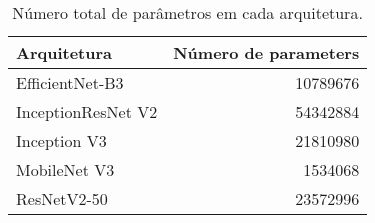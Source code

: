 \begin{table}
\caption{Número total de parâmetros em cada arquitetura.}
\label{tab:model_params}
\begin{tabular}{lr}
\toprule
Arquitetura & Número de parameters \\
\midrule
EfficientNet-B3 & 10789676 \\
InceptionResNet V2 & 54342884 \\
Inception V3 & 21810980 \\
MobileNet V3 & 1534068 \\
ResNetV2-50 & 23572996 \\
\bottomrule
\end{tabular}
\end{table}

